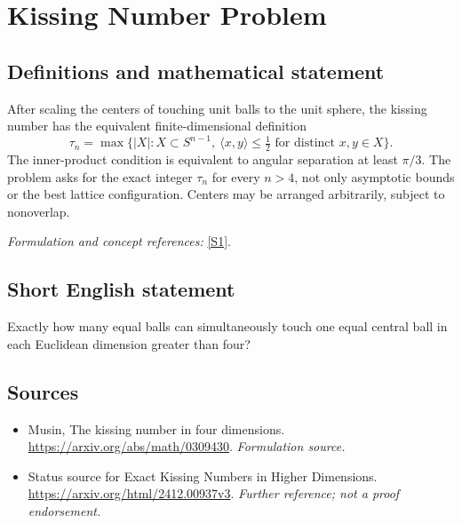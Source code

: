 \documentclass[11pt]{article}
\begin{document}
\section*{\texorpdfstring{Kissing Number Problem}{Kissing Number Problem}}\label{1369}
\subsection{Definitions and mathematical statement}
After scaling the centers of touching unit balls to the unit sphere, the kissing number has the equivalent finite-dimensional definition
\[
 \tau_n=\max\bigl\{|X|:X\subset S^{n-1},\ \langle x,y\rangle\le\tfrac12
                                  \text{ for distinct }x,y\in X\bigr\}.
\]
The inner-product condition is equivalent to angular separation at least $\pi/3$. The problem asks for the exact integer $\tau_n$ for every $n>4$, not only asymptotic bounds or the best lattice configuration. Centers may be arranged arbitrarily, subject to nonoverlap.
\par\smallskip\textit{Formulation and concept references:} \href{https://arxiv.org/abs/math/0309430}{[S1]}.

\subsection{Short English statement}
Exactly how many equal balls can simultaneously touch one equal central ball in each Euclidean dimension greater than four?
\subsection{Sources}
\begin{itemize}
\item[S1]Musin, The kissing number in four dimensions.
\url{https://arxiv.org/abs/math/0309430}.
\textit{Formulation source.}
\item[S2]Status source for Exact Kissing Numbers in Higher Dimensions.
\url{https://arxiv.org/html/2412.00937v3}.
\textit{Further reference; not a proof endorsement.}
\end{itemize}
\end{document}
